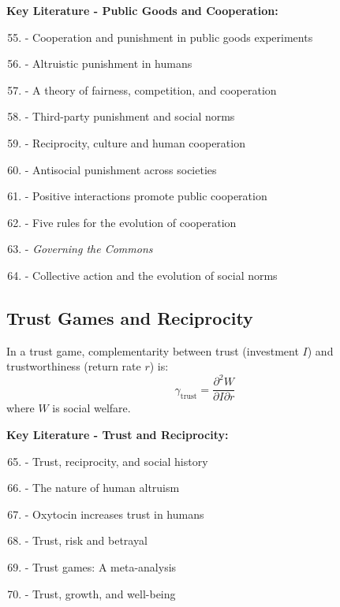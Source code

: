 \textbf{Key Literature - Public Goods and Cooperation:}
\begin{enumerate}[noitemsep]
    \setcounter{enumi}{54}
    \item \citet{fehr2000} - Cooperation and punishment in public goods experiments
    \item \citet{fehr2002} - Altruistic punishment in humans
    \item \citet{fehr1999} - A theory of fairness, competition, and cooperation
    \item \citet{fehr2004} - Third-party punishment and social norms
    \item \citet{gachter2008} - Reciprocity, culture and human cooperation
    \item \citet{herrmann2008} - Antisocial punishment across societies
    \item \citet{rand2009} - Positive interactions promote public cooperation
    \item \citet{nowak2006} - Five rules for the evolution of cooperation
    \item \citet{ostrom1990} - \textit{Governing the Commons}
    \item \citet{ostrom2000} - Collective action and the evolution of social norms
\end{enumerate}

\subsection{Trust Games and Reciprocity}
\label{subsec:trust-games}

\begin{definition}
In a trust game, complementarity between trust (investment $I$) and trustworthiness (return rate $r$) is:
\begin{equation}
\gamma_{\text{trust}} = \frac{\partial^2 W}{\partial I \partial r}
\end{equation}
where $W$ is social welfare.
\end{definition}

\textbf{Key Literature - Trust and Reciprocity:}
\begin{enumerate}[noitemsep]
    \setcounter{enumi}{64}
    \item \citet{berg1995} - Trust, reciprocity, and social history
    \item \citet{fehr2003} - The nature of human altruism
    \item \citet{kosfeld2005} - Oxytocin increases trust in humans
    \item \citet{bohnet2004} - Trust, risk and betrayal
    \item \citet{johnson2011} - Trust games: A meta-analysis
    \item \citet{algan2013} - Trust, growth, and well-being
\end{enumerate}

